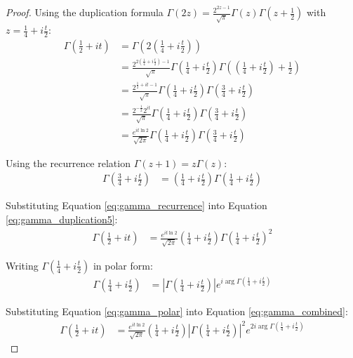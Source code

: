 \documentclass{article}
\begin{document}
\begin{proof}
Using the duplication formula $\Gamma(2z) = \frac{2^{2z-1}}{\sqrt{\pi}}\Gamma(z)\Gamma\left(z+\frac{1}{2}\right)$ with $z = \frac{1}{4}+i\frac{t}{2}$:
\begin{align}
\Gamma\left(\frac{1}{2}+it\right) &= \Gamma\left(2\left(\frac{1}{4}+i\frac{t}{2}\right)\right) \label{eq:gamma_duplication1}\\
&= \frac{2^{2\left(\frac{1}{4}+i\frac{t}{2}\right)-1}}{\sqrt{\pi}}\Gamma\left(\frac{1}{4}+i\frac{t}{2}\right)\Gamma\left(\left(\frac{1}{4}+i\frac{t}{2}\right)+\frac{1}{2}\right) \label{eq:gamma_duplication2}\\
&= \frac{2^{\frac{1}{2}+it-1}}{\sqrt{\pi}}\Gamma\left(\frac{1}{4}+i\frac{t}{2}\right)\Gamma\left(\frac{3}{4}+i\frac{t}{2}\right) \label{eq:gamma_duplication3}\\
&= \frac{2^{-\frac{1}{2}}2^{it}}{\sqrt{\pi}}\Gamma\left(\frac{1}{4}+i\frac{t}{2}\right)\Gamma\left(\frac{3}{4}+i\frac{t}{2}\right) \label{eq:gamma_duplication4}\\
&= \frac{e^{it\ln 2}}{\sqrt{2\pi}}\Gamma\left(\frac{1}{4}+i\frac{t}{2}\right)\Gamma\left(\frac{3}{4}+i\frac{t}{2}\right) \label{eq:gamma_duplication5}
\end{align}

Using the recurrence relation $\Gamma(z+1) = z\Gamma(z)$:
\begin{align}\label{eq:gamma_recurrence}
\Gamma\left(\frac{3}{4}+i\frac{t}{2}\right) &= \left(\frac{1}{4}+i\frac{t}{2}\right)\Gamma\left(\frac{1}{4}+i\frac{t}{2}\right)
\end{align}

Substituting Equation \eqref{eq:gamma_recurrence} into Equation \eqref{eq:gamma_duplication5}:
\begin{align}\label{eq:gamma_combined}
\Gamma\left(\frac{1}{2}+it\right) &= \frac{e^{it\ln 2}}{\sqrt{2\pi}}\left(\frac{1}{4}+i\frac{t}{2}\right)\Gamma\left(\frac{1}{4}+i\frac{t}{2}\right)^2
\end{align}

Writing $\Gamma\left(\frac{1}{4}+i\frac{t}{2}\right)$ in polar form:
\begin{align}\label{eq:gamma_polar}
\Gamma\left(\frac{1}{4}+i\frac{t}{2}\right) &= \left|\Gamma\left(\frac{1}{4}+i\frac{t}{2}\right)\right|e^{i\arg\Gamma\left(\frac{1}{4}+i\frac{t}{2}\right)}
\end{align}

Substituting Equation \eqref{eq:gamma_polar} into Equation \eqref{eq:gamma_combined}:
\begin{align}\label{eq:gamma_polar_substituted}
\Gamma\left(\frac{1}{2}+it\right) &= \frac{e^{it\ln 2}}{\sqrt{2\pi}}\left(\frac{1}{4}+i\frac{t}{2}\right)\left|\Gamma\left(\frac{1}{4}+i\frac{t}{2}\right)\right|^2e^{2i\arg\Gamma\left(\frac{1}{4}+i\frac{t}{2}\right)}
\end{align}


\end{proof}
\end{document}
